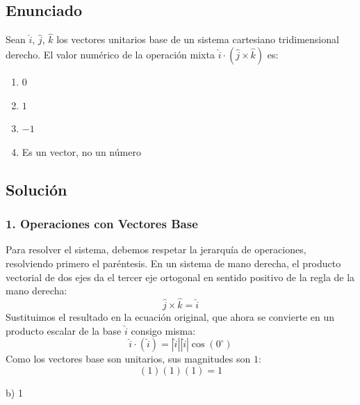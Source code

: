 \documentclass[12pt, a4paper]{article}
\begin{document}
\newpage


\subsection*{Enunciado}
Sean $\hat{i}$, $\hat{j}$, $\hat{k}$ los vectores unitarios base de un sistema cartesiano tridimensional derecho. El valor numérico de la operación mixta $\hat{i} \cdot (\hat{j} \times \hat{k})$ es:
\begin{enumerate}[label=\alph*)]
    \item $0$
    \item $1$
    \item $-1$
    \item Es un vector, no un número
\end{enumerate}

\subsection*{Solución}

\subsubsection*{1. Operaciones con Vectores Base}
Para resolver el sistema, debemos respetar la jerarquía de operaciones, resolviendo primero el paréntesis.
En un sistema de mano derecha, el producto vectorial de dos ejes da el tercer eje ortogonal en sentido positivo de la regla de la mano derecha:
$$ \hat{j} \times \hat{k} = \hat{i} $$
Sustituimos el resultado en la ecuación original, que ahora se convierte en un producto escalar de la base $\hat{i}$ consigo misma:
$$ \hat{i} \cdot (\hat{i}) = |\hat{i}||\hat{i}|\cos(0^\circ) $$
Como los vectores base son unitarios, sus magnitudes son $1$:
$$ (1)(1)(1) = 1 $$

\begin{tcolorbox}[colback=green!5!white, colframe=green!50!black, title=Respuesta Final]
\centering \Large b) 1
\end{tcolorbox}

\newpage

\end{document}
